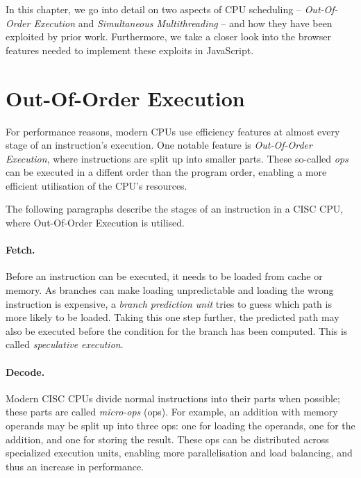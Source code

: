 \documentclass[11pt,
  titlepage=false,
]{scrreprt}
\begin{document}
In this chapter, we go into detail on two aspects of CPU scheduling
-- \textit{Out-Of-Order Execution} and \textit{Simultaneous Multithreading} --
and how they have been exploited by prior work.
Furthermore, we take a closer look into the browser features needed to implement these exploits in JavaScript.

\section{Out-Of-Order Execution}
\label{sec:outoforderexecution}
For performance reasons, modern CPUs use efficiency features at almost every stage of an instruction's execution.
One notable feature is \textit{Out-Of-Order Execution},
where instructions are split up into smaller parts.
These so-called \textit{\textmu ops} can be executed in a diffent order than the program order,
enabling a more efficient utilisation of the CPU's resources.

The following paragraphs describe the stages of an instruction in a CISC CPU,
where Out-Of-Order Execution is utilised.

\paragraph{Fetch.}
Before an instruction can be executed, it needs to be loaded from cache or memory.
As branches can make loading unpredictable and loading the wrong instruction is expensive, a \textit{branch prediction unit} tries to guess which path is more likely to be loaded.
Taking this one step further, the predicted path may also be executed before the condition for the branch has been computed.
This is called \textit{speculative execution}\cite{AMD2020OptimizationEPYC7002}.

\paragraph{Decode.}
Modern CISC CPUs divide normal instructions into their parts when possible;
these parts are called \textit{micro-ops} (\textmu ops)\cite{AMD2020OptimizationEPYC7002}.
For example, an addition with memory operands may be split up into three \textmu ops: one for loading the operands, one for the addition, and one for storing the result.
These \textmu ops can be distributed across specialized execution units, enabling more parallelisation and load balancing, and thus an increase in performance.
\end{document}
